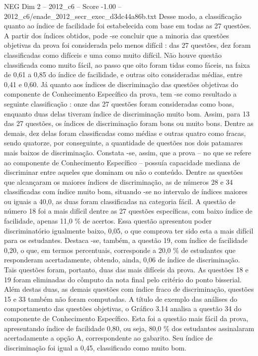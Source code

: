 \begin{textsample}{NEG Dim 2 – 2012\_c6 – Score -1.00 – 2012\_c6/enade\_2012\_secr\_exec\_d3dc44a86b.txt}
Desse modo, a classificação quanto ao índice de facilidade foi estabelecida com base em todas as 27 questões.
A partir dos índices obtidos, pode -se concluir que a minoria das questões objetivas da prova foi considerada pelo menos difícil : das 27 questões, dez foram classificadas como difíceis e uma como muito difícil.
Não houve questão classificada como muito fácil, ao passo que oito foram tidas como fáceis, na faixa de 0,61 a 0,85 do índice de facilidade, e outras oito consideradas médias, entre 0,41 e 0,60.
Já quanto aos índices de discriminação das questões objetivas do componente de Conhecimento Específico da prova, tem -se como resultado a seguinte classificação : onze das 27 questões foram consideradas como boas, enquanto duas delas tiveram índice de discriminação muito bom.
Assim, para 13 das 27 questões, os índices de discriminação foram bons ou muito bons.
Dentre as demais, dez delas foram classificadas como médias e outras quatro como fracas, sendo quatorze, por conseguinte, a quantidade de questões nos dois patamares mais baixos de discriminação.
Constata -se, assim, que a prova – no que se refere ao componente de Conhecimento Específico – possuía capacidade mediana de discriminar entre aqueles que dominam ou não o conteúdo.
Dentre as questões que alcançaram os maiores índices de discriminação, as de números 28 e 34 classificadas com índice muito bom, situando -se no intervalo de índices maiores ou iguais a 40,0, as duas foram classificadas na categoria fácil.
A questão de número 18 foi a mais difícil dentre as 27 questões específicas, com baixo índice de facilidade, apenas 11,0 \% de acertos.
Essa questão apresentou poder discriminatório igualmente baixo, 0,05, o que comprova ter sido esta a mais difícil para os estudantes.
Destaca -se, também, a questão 19, com índice de facilidade 0,20, o que, em termos percentuais, corresponde a 20,0 \% de estudantes que responderam acertadamente, obtendo, ainda, 0,06 de índice de discriminação.
Tais questões foram, portanto, duas das mais difíceis da prova.
As questões 18 e 19 foram eliminadas do cômputo da nota final pelo critério do ponto bisserial.
Além destas duas, as demais questões com índice fraco de discriminação, questões 15 e 33 também não foram computadas.
A título de exemplo das análises do comportamento das questões objetivas, o Gráfico 3.14 analisa a questão 34 do componente de Conhecimento Específico.
Esta foi a questão mais fácil da prova, apresentando índice de facilidade 0,80, ou seja, 80,0 \% dos estudantes assinalaram acertadamente a opção A, correspondente ao gabarito.
Seu índice de discriminação foi igual a 0,45, classificado como muito bom.

\end{textsample}
